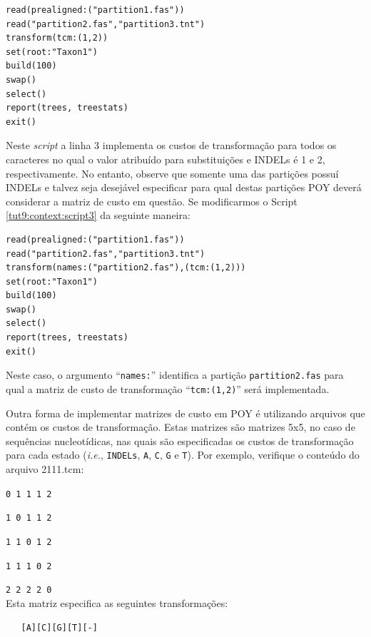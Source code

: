 \begin{refsection}
\begin{lstlisting}[caption= Modificação do arquivo partitions\_script.poy para implementar matriz de custo de transformação.,label=tut9:context:script3]
read(prealigned:("partition1.fas"))
read("partition2.fas","partition3.tnt")
transform(tcm:(1,2))
set(root:"Taxon1")
build(100)
swap()
select()
report(trees, treestats)
exit()
\end{lstlisting}

Neste \textit{script} a linha 3 implementa os custos de transformação para todos os caracteres no qual o valor atribuído para substituições e INDELs é 1 e 2, respectivamente. No entanto, observe que somente uma das partições possuí INDELs e talvez seja desejável especificar para qual destas partições POY deverá considerar a matriz de custo em questão. Se modificarmos o Script \ref{tut9:context:script3} da seguinte maneira:

\begin{lstlisting}[caption= Modificação do arquivo partitions\_script.poy para implementar matriz de custo de transformação para a partição \texttt{partition2.fas}.,label=tut9:context:script4]
read(prealigned:("partition1.fas"))
read("partition2.fas","partition3.tnt")
transform(names:("partition2.fas"),(tcm:(1,2)))
set(root:"Taxon1")
build(100)
swap()
select()
report(trees, treestats)
exit()
\end{lstlisting}

Neste caso, o argumento ``\texttt{names:}'' identifica a partição \texttt{partition2.fas} para qual a matriz de custo de transformação ``\texttt{tcm:(1,2)}'' será implementada.

Outra forma de implementar matrizes de custo em POY é utilizando arquivos que contém os custos de transformação. Estas matrizes são matrizes 5x5, no caso de sequências nucleotídicas, nas quais são especificadas os custos de transformação para cada estado (\textit{i.e.}, \texttt{INDELs}, \texttt{A}, \texttt{C}, \texttt{G} e \texttt{T}). Por exemplo, verifique o conteúdo do arquivo 2111.tcm:

\texttt{0 1 1 1 2}

\texttt{1 0 1 1 2}

\texttt{1 1 0 1 2}

\texttt{1 1 1 0 2}

\texttt{2 2 2 2 0}\\

	Esta matriz especifica as seguintes transformações:


\texttt{~~~[A][C][G][T][-]}


\end{refsection}
